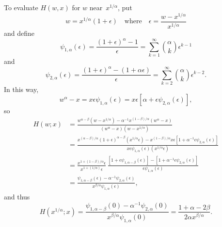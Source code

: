 \documentclass[12pt,a4paper]{article}
\begin{document}
To evaluate $H(w,x)$ for $w$ near~$x^{1/\alpha}$, put
\[
w=x^{1/\alpha}(1+\epsilon)\quad\text{where}\quad 
\epsilon=\frac{w-x^{1/\alpha}}{x^{1/\alpha}}
\]
and define
\[
\psi_{1,\alpha}(\epsilon)=\frac{(1+\epsilon)^\alpha-1}{\epsilon}
    =\sum_{k=1}^\infty\binom{\alpha}{k}\epsilon^{k-1}
\]
and
\[
\psi_{2,\alpha}(\epsilon)
    =\frac{(1+\epsilon)^\alpha-(1+\alpha\epsilon)}{\epsilon}
    =\sum_{k=2}^\infty\binom{\alpha}{k}\epsilon^{k-2}.
\]
In this way,
\[
w^\alpha-x=x\epsilon\psi_{1,\alpha}(\epsilon)
    =x\epsilon[\alpha+\epsilon\psi_{2,\alpha}(\epsilon)],
\]
so
\begin{align*}
H(w;x)&=\frac{w^{\alpha-\beta}(w-x^{1/\alpha})
-\alpha^{-1}x^{(1-\beta)/\alpha}(w^\alpha-x)}{(w^\alpha-x)(w-x^{1/\alpha})}\\
&=\frac{x^{(\alpha-\beta)/\alpha}(1+\epsilon)^{\alpha-\beta}
(x^{1/\alpha}\epsilon)-x^{(1-\beta)/\alpha}x\epsilon 
[1+\alpha^{-1}\epsilon\psi_{2,\alpha}(\epsilon)]}%
{x\epsilon\psi_{1,\alpha}(\epsilon)(x^{1/\alpha}\epsilon)}\\
&=\frac{x^{1+(1-\beta)/\alpha}\epsilon}{x^{1+(1/\alpha)}\epsilon}\,
\frac{[1+\epsilon\psi_{1,\alpha-\beta}(\epsilon)]
-[1+\alpha^{-1}\epsilon\psi_{2,\alpha}(\epsilon)]}%
{\epsilon\psi_{1,\alpha}(\epsilon)}\\
&=\frac{\psi_{1,\alpha-\beta}(\epsilon)-\alpha^{-1}\psi_{2,\alpha}(\epsilon)}%
{x^{\beta/\alpha}\psi_{1,\alpha}(\epsilon)},
\end{align*}
and thus
\[
H(x^{1/\alpha};x)=\frac{\psi_{1,\alpha-\beta}(0)
-\alpha^{-1}\psi_{2,\alpha}(0)}{x^{\beta/\alpha}\psi_{1,\alpha}(0)}
    =\frac{1+\alpha-2\beta}{2\alpha x^{\beta/\alpha}}.
\]
\end{document}
